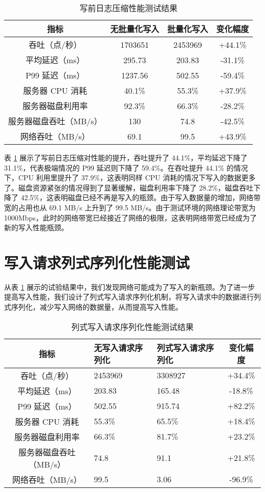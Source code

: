 \begin{table}
  \centering
  \caption{写前日志压缩性能测试结果}
  \begin{tabular}{cccc}
    \toprule 
    指标 & 无批量化写入 & 批量化写入 & 变化幅度 \\
    \midrule
    吞吐（点/秒） & 1703651 & 2453969 & +44.1\%\\
    平均延迟（ms） & 295.73 & 203.83 & -31.1\%\\
    P99 延迟（ms） & 1237.56 & 502.55& -59.4\% \\
    服务器 CPU 消耗 & 40.1\% & 	55.3\% & +37.9\%\\
    服务器磁盘利用率 & 92.3\% & 	66.3\% & -28.2\%\\
    服务器磁盘吞吐（MB/s） & 130 & 	74.8 & -42.5\% \\
    网络吞吐（MB/s） & 69.1 & 	99.5 & +43.9\%\\
    \bottomrule 
  \end{tabular}
  \label{tabular:wal-compression-performance}
\end{table}

表 \ref{tabular:wal-compression-performance} 展示了写前日志压缩对性能的提升，吞吐提升了 44.1\%，平均延迟下降了 31.1\%，代表极端情况的 P99 延迟则下降了 59.4\%。在吞吐提升 44.1\% 的情况下，CPU 利用里提升了 37.9\%，这表明同样 CPU 消耗的情况下写入的数据更多了。磁盘资源紧张的情况得到了显著缓解，磁盘利用率下降了 28.2\%，磁盘吞吐下降了 42.5\%，这表明磁盘已经不再是写入的瓶颈。由于写入数据量的增加，网络带宽的占用也从 69.1 MB/s 上升到了 99.5 MB/s。由于测试环境的网络理论带宽为 1000Mbps，此时的网络带宽已经接近了网络的极限，这表明网络带宽已经成为了新的写入性能瓶颈。


\section{写入请求列式序列化性能测试}
从表 \ref{tabular:wal-compression-performance} 展示的试验结果中，我们发现网络可能成为了写入的新瓶颈。为了进一步提高写入性能，我们设计了列式写入请求序列化机制，将写入请求中的数据进行列式序列化，减少写入网络的数据量，从而提高写入性能。

\begin{table}
  \centering
  \caption{列式写入请求序列化性能测试结果}
  \begin{tabular}{cp{3.5cm}p{3.5cm}c}
    \toprule 
    指标 &  无写入请求序列化 & 列式写入请求序列化 & 变化幅度 \\
    \midrule  
    吞吐（点/秒） & 2453969 & 3308927 & +34.4\%\\  
    平均延迟（ms） & 203.83 & 165.48 & -18.8\%\\  
    P99 延迟（ms） & 502.55 & 915.74 & +82.2\%\\  
    服务器 CPU 消耗 & 55.3\% & 65.5\% & +18.4\%\\  
    服务器磁盘利用率 & 66.3\% & 81.7\% & +23.2\%\\  
    服务器磁盘吞吐（MB/s） & 74.8 & 91.1 & +21.8\%\\  
    网络吞吐（MB/s） & 99.5 & 3.06 & -96.9\%\\  
    \bottomrule 
  \end{tabular}
  \label{tabular:columnar-serialization-performance}
\end{table}

